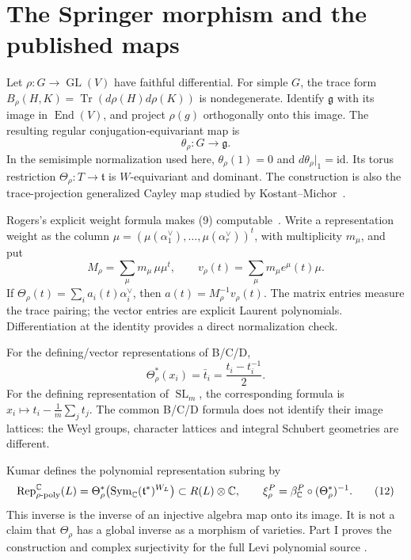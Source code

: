 \documentclass[11pt,letterpaper]{article}
\newcommand{\Sym}{\operatorname{Sym}}\newcommand{\Rep}{\operatorname{Rep}}
\newcommand{\SL}{\operatorname{SL}}\newcommand{\GL}{\operatorname{GL}}
\theoremstyle{definition}\newtheorem{definition}[theorem]{Definition}
\begin{document}
\section{The Springer morphism and the published maps}
Let \(\rho:G\to\GL(V)\) have faithful differential. For simple \(G\),
the trace form
\(B_\rho(H,K)=\operatorname{Tr}(d\rho(H)d\rho(K))\)
is nondegenerate. Identify \(\mathfrak g\) with its image in
\(\operatorname{End}(V)\), and project \(\rho(g)\) orthogonally onto
this image. The resulting regular conjugation-equivariant map is
\[
 \theta_\rho:G\longrightarrow\mathfrak g.
 \tag{9}
\]
In the semisimple normalization used here,
\(\theta_\rho(1)=0\) and \(d\theta_\rho|_1=\mathrm{id}\).
Its torus restriction \(\Theta_\rho:T\to\mathfrak t\) is
\(W\)-equivariant and dominant. The construction is also the
trace-projection generalized Cayley map studied by
Kostant--Michor~\cite{KM}.

Rogers's explicit weight formula makes (9) computable~\cite{Rogers}.
Write a representation weight as the column
\(\mu=(\mu(\alpha_1^\vee),\ldots,\mu(\alpha_r^\vee))^t\), with
multiplicity \(m_\mu\), and put
\[
 M_\rho=\sum_\mu m_\mu\,\mu\mu^t,\qquad
 v_\rho(t)=\sum_\mu m_\mu e^\mu(t)\mu.
 \tag{10}
\]
If \(\Theta_\rho(t)=\sum_i a_i(t)\alpha_i^\vee\), then
\(a(t)=M_\rho^{-1}v_\rho(t)\).
The matrix entries measure the trace pairing; the vector entries
are explicit Laurent polynomials. Differentiation at the identity
provides a direct normalization check.

For the defining/vector representations of B/C/D,
\[
 \Theta_\rho^*(x_i)=\bar t_i=\frac{t_i-t_i^{-1}}2.
 \tag{11}
\]
For the defining representation of \(\SL_m\), the corresponding
formula is \(x_i\mapsto t_i-\frac1m\sum_jt_j\).
The common B/C/D formula does not identify their image lattices:
the Weyl groups, character lattices and integral Schubert geometries
are different.

Kumar defines the polynomial representation subring by
\[
 \Rep_{\rho\text{-}\poly}^{\C}(L)
   =\Theta_\rho^*\bigl(\Sym_\C(\mathfrak t^*)^{W_L}\bigr)
   \subset R(L)\otimes\C,
 \qquad
 \xi_\rho^P=\beta_\C^P\circ(\Theta_\rho^*)^{-1}.
 \tag{12}
\]
This inverse is the inverse of an injective algebra map onto its
image. It is not a claim that \(\Theta_\rho\) has a global inverse
as a morphism of varieties. Part I proves the construction and
complex surjectivity for the full Levi polynomial source
\cite[Definition 4 and Theorem 5]{Kumar}.
\end{document}
